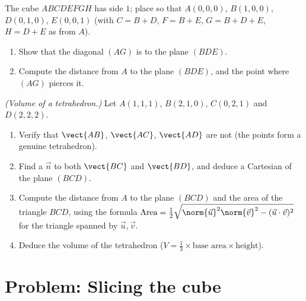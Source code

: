 \begin{exercise}[$\star\star\star$]\label{exo:g12:space:8}
The cube $ABCDEFGH$ has side $1$; place  so that
$A(0,0,0)$, $B(1,0,0)$, $D(0,1,0)$, $E(0,0,1)$ (with
$C = B + D$, $F = B + E$, $G = B + D + E$, $H = D + E$ as  from
$A$).
\begin{enumerate}
  \item Show that the diagonal $(AG)$ is  to the plane $(BDE)$.
  \item Compute the distance from $A$ to the plane $(BDE)$, and the point
        where $(AG)$ pierces it.
\end{enumerate}
\end{exercise}

\begin{exercise}[$\star\star\star$]\label{exo:g12:space:9}
\emph{(Volume of a tetrahedron.)} Let $A(1,1,1)$, $B(2,1,0)$, $C(0,2,1)$
and $D(2,2,2)$.
\begin{enumerate}
  \item Verify that $\vect{AB}$, $\vect{AC}$, $\vect{AD}$ are not 
        (the points form a genuine tetrahedron).
  \item Find a  $\vec n$  to both $\vect{BC}$ and
        $\vect{BD}$, and deduce a Cartesian  of the plane $(BCD)$.
  \item Compute the distance from $A$ to the plane $(BCD)$ and the area of
        the triangle $BCD$, using the formula
        $\text{Area} = \frac12\sqrt{\norm{\vec u}^2\norm{\vec v}^2 -
        (\vec u \cdot \vec v)^2}$ for the triangle spanned by
        $\vec u, \vec v$.
  \item Deduce the volume of the tetrahedron
        ($V = \frac13 \times \text{base area} \times \text{height}$).
\end{enumerate}
\end{exercise}

\section{Problem: Slicing the cube}

